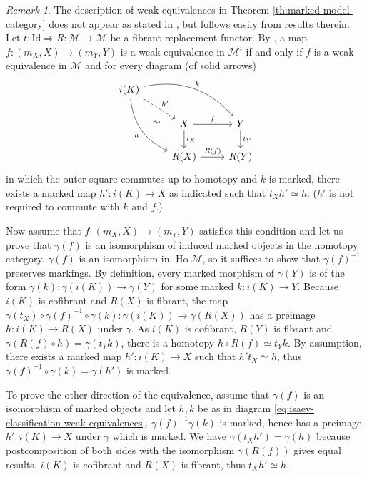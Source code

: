 \documentclass[a4paper]{article}
\theoremstyle{remark}
\newtheorem{remark}[theorem]{Remark}
\theoremstyle{definition}
\begin{document}
\begin{remark}
  The description of weak equivalences in Theorem \ref{th:marked-model-category} does not appear as stated in \citet{marked-objects}, but follows easily from results therein.
  Let $t : \mathrm{Id} \Rightarrow R : \mathcal{M} \rightarrow \mathcal{M}$ be a fibrant replacement functor.
  By \citet[lemma 2.5]{marked-objects}, a map $f : (m_X, X) \rightarrow (m_Y, Y)$ is a weak equivalence in $\mathcal{M}^i$ if and only if $f$ is a weak equivalence in $\mathcal{M}$ and for every diagram (of solid arrows)
  \begin{equation}
    \label{eq:isaev-classification-weak-equivalences}
    \begin{tikzcd}
      i(K) \arrow[drr, bend left, "k"] \arrow[ddr, bend right, "h"'] \arrow[dr, dashed, "h'"] \arrow[ddr, phantom, "\simeq"] \\
      & X \arrow[d, "t_X"] \arrow[r, "f"] & Y \arrow[d, "t_Y"]  \\
      & R(X) \arrow[r, "R(f)"] & R(Y)
    \end{tikzcd}
  \end{equation}
  in which the outer square commutes up to homotopy and $k$ is marked, there exists a marked map $h' : i(K) \rightarrow X$ as indicated such that $t_X h' \simeq h$.
  ($h'$ is not required to commute with $k$ and $f$.)

  Now assume that $f : (m_X, X) \rightarrow (m_Y, Y)$ satisfies this condition and let us prove that $\gamma(f)$ is an isomorphism of induced marked objects in the homotopy category.
  $\gamma(f)$ is an isomorphism in $\operatorname{Ho} \mathcal{M}$, so it suffices to show that $\gamma(f)^{-1}$ preserves markings.
  By definition, every marked morphism of $\gamma(Y)$ is of the form $\gamma(k) : \gamma(i(K)) \rightarrow \gamma(Y)$ for some marked $k : i(K) \rightarrow Y$.
  Because $i(K)$ is cofibrant and $R(X)$ is fibrant, the map $\gamma(t_X) \circ \gamma(f)^{-1} \circ \gamma(k) : \gamma(i(K)) \rightarrow \gamma(R(X))$ has a preimage $h : i(K) \rightarrow R(X)$ under $\gamma$.
  As $i(K)$ is cofibrant, $R(Y)$ is fibrant and $\gamma(R(f) \circ h) = \gamma(t_Y k)$, there is a homotopy $h \circ R(f) \simeq t_Y k$.
  By assumption, there exists a marked map $h' : i(K) \rightarrow X$ such that $h' t_X \simeq h$, thus $\gamma(f)^{-1} \circ \gamma(k) = \gamma(h')$ is marked.

  To prove the other direction of the equivalence, assume that $\gamma(f)$ is an isomorphism of marked objects and let $h, k$ be as in diagram \eqref{eq:isaev-classification-weak-equivalences}.
  $\gamma(f)^{-1} \gamma(k)$ is marked, hence has a preimage $h' : i(K) \rightarrow X$ under $\gamma$ which is marked.
  We have $\gamma(t_X h') = \gamma(h)$ because postcomposition of both sides with the isomorphism $\gamma(R(f))$ gives equal results.
  $i(K)$ is cofibrant and $R(X)$ is fibrant, thus $t_X h' \simeq h$.
\end{remark}
\end{document}
